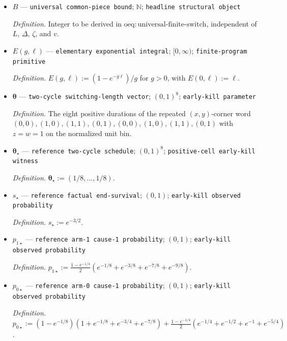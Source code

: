 \documentclass{article}
\begin{document}
\begin{itemize}
  \par\smallskip\noindent\emph{Definition.} \(h_{\zeta}(v):=\inf_{(r,s)\in\mathcal A_{\zeta}}(r+vs)\).
  \item \(B\) --- \texttt{universal common-\allowbreak{}piece bound}; \(\mathbb N\); \texttt{headline structural object}
  \par\smallskip\noindent\emph{Definition.} Integer to be derived in \(\mathrm{oeq{:}universal\text{-}finite\text{-}switch}\), independent of \(L\), \(\Delta\), \(\zeta\), and \(v\).
  \item \(E(g,\ell)\) --- \texttt{elementary exponential integral}; \([0,\infty)\); \texttt{finite-\allowbreak{}program primitive}
  \par\smallskip\noindent\emph{Definition.} \(E(g,\ell):=(1-e^{-g\ell})/g\) for \(g>0\), with \(E(0,\ell):=\ell\).
  \item \(\boldsymbol\theta\) --- \texttt{two-\allowbreak{}cycle switching-\allowbreak{}length vector}; \((0,1)^8\); \texttt{early-\allowbreak{}kill parameter}
  \par\smallskip\noindent\emph{Definition.} The eight positive durations of the repeated \((x,y)\)-corner word \((0,0),(1,0),(1,1),(0,1),(0,0),(1,0),(1,1),(0,1)\) with \(z=w=1\) on the normalized unit bin.
  \item \(\boldsymbol\theta_\star\) --- \texttt{reference two-\allowbreak{}cycle schedule}; \((0,1)^8\); \texttt{positive-\allowbreak{}cell early-\allowbreak{}kill witness}
  \par\smallskip\noindent\emph{Definition.} \(\boldsymbol\theta_\star:=(1/8,\ldots,1/8)\).
  \item \(s_\star\) --- \texttt{reference factual end-\allowbreak{}survival}; \((0,1)\); \texttt{early-\allowbreak{}kill observed probability}
  \par\smallskip\noindent\emph{Definition.} \(s_\star:=e^{-3/2}\).
  \item \(p_{1\star}\) --- \texttt{reference arm-\allowbreak{}1 cause-\allowbreak{}1 probability}; \((0,1)\); \texttt{early-\allowbreak{}kill observed probability}
  \par\smallskip\noindent\emph{Definition.} \(p_{1\star}:=\frac{1-e^{-1/4}}{2}(e^{-1/8}+e^{-3/8}+e^{-7/8}+e^{-9/8})\).
  \item \(p_{0\star}\) --- \texttt{reference arm-\allowbreak{}0 cause-\allowbreak{}1 probability}; \((0,1)\); \texttt{early-\allowbreak{}kill observed probability}
  \par\smallskip\noindent\emph{Definition.} \(p_{0\star}:=(1-e^{-1/8})(1+e^{-1/8}+e^{-3/4}+e^{-7/8})+\frac{1-e^{-1/4}}{2}(e^{-1/4}+e^{-1/2}+e^{-1}+e^{-5/4})\).

\end{itemize}
\end{document}
